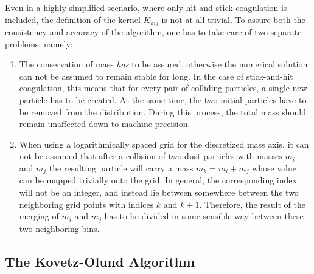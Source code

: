     Even in a highly simplified scenario, where only hit-and-stick coagulation is included, the 
    definition of the kernel $K_{kij}$ is not at all trivial. To assure both the consistency and 
    accuracy of the algorithm, one has to take care of two separate problems, namely:
    \begin{enumerate}
        \item The conservation of mass \textit{has} to be assured, otherwise the numerical solution can 
            not be assumed to remain stable for long. In the case of stick-and-hit coagulation, this 
            means that for every pair of colliding particles, a single new particle has to be created. 
            At the same time, the two initial particles have to be removed from the distribution. 
            During this process, the total mass should remain unaffected down to machine precision.
        \item When using a logarithmically spaced grid for the discretized mass axis, it can not be 
            assumed that after a collision of two dust particles with masses $m_i$ and $m_j$ the 
            resulting particle will carry a mass $m_k=m_i+m_j$ whose value can be mapped trivially onto 
            the grid. In general, the corresponding index will not be an integer, and instead lie 
            between somewhere between the two neighboring grid points with indices $k$ and $k+1$.
            Therefore, the result of the merging of $m_i$ and $m_j$ has to be divided in some sensible 
            way between these two neighboring bins.
    \end{enumerate}
    
    \subsection{The Kovetz-Olund Algorithm}
        
